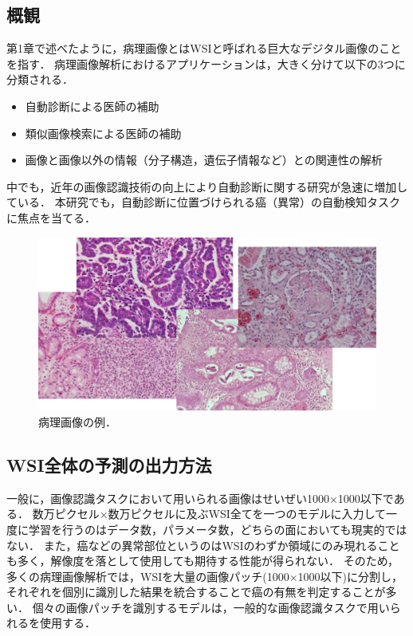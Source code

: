\subsection{概観}
第1章で述べたように，病理画像とはWSIと呼ばれる巨大なデジタル画像のことを指す．
病理画像解析におけるアプリケーションは，大きく分けて以下の3つに分類される\cite{komuraishikawa}．
\begin{itemize}
    \item 自動診断による医師の補助
    \item 類似画像検索による医師の補助
    \item 画像と画像以外の情報（分子構造，遺伝子情報など）との関連性の解析
\end{itemize}
中でも，近年の画像認識技術の向上により自動診断に関する研究が急速に増加している\cite{doyle2008automated,dundar2011computerized}．
本研究でも，自動診断に位置づけられる癌（異常）の自動検知タスクに焦点を当てる．

\begin{figure}[tbp]
    \label{fig:path_images}
     \begin{center}
      \includegraphics[width=13cm]{figures/path_images.png}
     \end{center}
    \caption{病理画像の例．}
\end{figure}
    
\subsection{WSI全体の予測の出力方法}
一般に，画像認識タスクにおいて用いられる画像はせいぜい1000×1000以下である．
数万ピクセル×数万ピクセルに及ぶWSI全てを一つのモデルに入力して一度に学習を行うのはデータ数，パラメータ数，どちらの面においても現実的ではない．
また，癌などの異常部位というのはWSIのわずか領域にのみ現れることも多く，解像度を落として使用しても期待する性能が得られない．
そのため，多くの病理画像解析では，WSIを大量の画像パッチ(1000×1000以下)に分割し，それぞれを個別に識別した結果を統合することで癌の有無を判定することが多い．
個々の画像パッチを識別するモデルは，一般的な画像認識タスクで用いられるを使用する．

